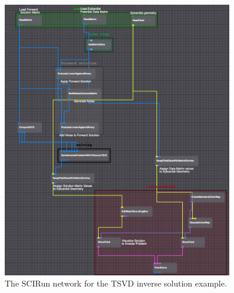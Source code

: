     \begin{figure}
        \begin{center}
        \includegraphics[width=0.9\textwidth]{ECGToolkitGuide_figures/TSVDNetwork.png}
        \caption{The SCIRun network for the TSVD inverse solution example.}
        \label{fig:TSVDNetworkExample}
        \end{center}
    \end{figure}








